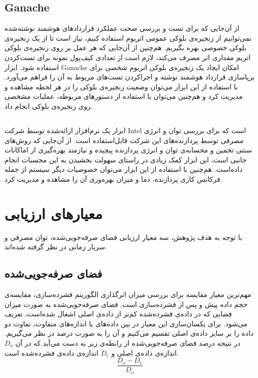 \subsection{Ganache}
از آن‌جایی که برای تست و بررسی صحت عملکرد قراردادهای هوشمند نوشته‌شده نمی‌توانیم از زنجیره‌ی بلوکی عمومی اتریوم استفاده کنیم، نیاز است تا از یک زنجیره‌ی بلوکی خصوصی بهره بگیریم. هم‌چنین از آن‌جایی که هر عمل بر روی زنجیره‌ی بلوکی اتریم مقداری اتر مصرف می‌کند، لازم است از تعدادی کیف‌پول نمونه برای تست‌کردن استفاده شود. ابزار Ganache امکان ایجاد یک زنجیره‌ی بلوکی اتریوم شخصی برای برپاسازی قرارداد هوشمند نوشته و اجراکردن تست‌های مربوط به آن را فراهم می‌آورد. با استفاده از این ابزار می‌توان وضعیت زنجیره‌ی بلوکی را در هر لحظه مشاهده و مدیریت کرد و هم‌چنین می‌توان با استفاده از دستورهای مربوطه، عملیات مشخصی روی زنجیره‌ی بلوکی انجام داد.  

\subsection{}
ابزار  یک نرم‌افزار ارائه‌شده توسط شرکت Intel است که برای بررسی توان و انرژی مصرفی توسط پردازنده‌های این شرکت قابل‌استفاده است. از آن‌جایی که روش‌های سنتی تخمین و محسابه‌ی توان و انرژی پردازنده پیچیده و نیازمند بهره‌گیری از اماکانات جانبی است، این ابزار کمک زیادی در راستای سهولت بخشیدن به این محسبات انجام داده‌است. هم‌چنین با استفاده از این ابزار می‌توان خصوصیات دیگر سیستم از جمله فرکانس کاری پردازنده، دما و میزان بهره‌وری آن را مشاهده و مدیریت کرد.

\section{معیارهای ارزیابی}
با توجه به هدف پژوهش، سه معیار ارزیابی فضای صرفه‌جویی‌شده، توان مصرفی و سربار زمانی در نظر گرفته شده‌اند.

\subsection{فضای صرفه‌جویی‌شده}
مهم‌ترین معیار مقایسه برای بررسی میزان اثرگذاری الگوریتم فشرده‌سازی، مقایسه‌ی حجم داده پیش و پس از فشرده‌سازی است. فضای صرفه‌جویی‌شده به صورت میزان فضایی که در داده‌ی فشرده‌شده کم‌تر از داده‌ی اصلی اشغال شده‌است، تعریف می‌شود. برای یکسان‌سازی این معیار در بین داده‌های با اندازه‌های متفاوت، تفاوت دو داده را بر سایز داده‌ی اصلی تقسیم می‌کنیم و آن را به صورت درصد در نظر می‌گیریم. در نتیجه درصد فضای صرفه‌جویی‌شده از رابطه‌ی زیر به دست می‌آید که در آن 
${D_o}$
 اندازه‌ی داده‌ی اصلی و 
${D_c}$
اندازه‌ی داده‌ی فشرده‌شده است.
\[ \frac{D_o - D_c}{D_o}\]

